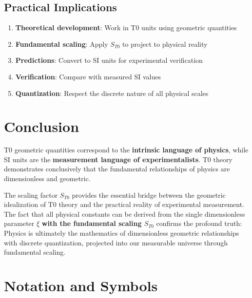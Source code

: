 \documentclass[12pt,a4paper]{article}
\begin{document}
	\subsection{Practical Implications}
	\begin{enumerate}
		\item \textbf{Theoretical development}: Work in T0 units using geometric quantities
		\item \textbf{Fundamental scaling}: Apply $S_{T0}$ to project to physical reality
		\item \textbf{Predictions}: Convert to SI units for experimental verification
		\item \textbf{Verification}: Compare with measured SI values
		\item \textbf{Quantization}: Respect the discrete nature of all physical scales
	\end{enumerate}
	
	\section{Conclusion}
	
	T0 geometric quantities correspond to the \textbf{intrinsic language of physics}, while SI units are the \textbf{measurement language of experimentalists}. T0 theory demonstrates conclusively that the fundamental relationships of physics are dimensionless and geometric.
	
	The scaling factor $S_{T0}$ provides the essential bridge between the geometric idealization of T0 theory and the practical reality of experimental measurement. The fact that all physical constants can be derived from the single dimensionless parameter $\xi$ \textbf{with the fundamental scaling $S_{T0}$} confirms the profound truth: Physics is ultimately the mathematics of dimensionless geometric relationships with discrete quantization, projected into our measurable universe through fundamental scaling.
	
	\appendix
	\section{Notation and Symbols}
	
\end{document}
